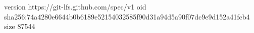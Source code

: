 version https://git-lfs.github.com/spec/v1
oid sha256:74a4280e6644b0b6189e52154032585f90d31a94d5a90f07dc9e9d152a41fcb4
size 87544
